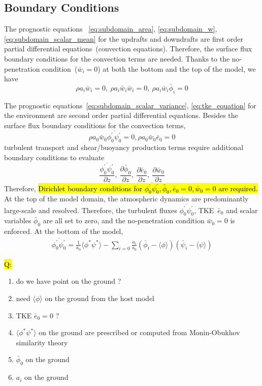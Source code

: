 \documentclass{report}
\begin{document}
\subsection{Boundary Conditions} 
\label{sec:Boundary Conditions}
The prognostic equations ~\ref{eq:subdomain_area}, \ref{eq:subdomain_w}, \ref{eq:subdomain_scalar_mean} for the updrafts and downdrafts are first order partial differential equations~(convection equations). 
Therefore, the surface flux boundary conditions for the convection terms are needed.
Thanks to the no-penetration condition~($ \bar{w}_i = 0$) at both the bottom and the top of the model, we have 
$$\rho a_i \bar{w}_i = 0,\ \rho a_i \bar{w}_i\bar{w}_i = 0,\ \rho a_i \bar{w}_i\bar{\phi}_i = 0 $$


The prognostic equations~\ref{eq:subdomain_scalar_variance}, \ref{eq:tke_equation} for the environment are second order partial differential equations. Besides the surface flux boundary conditions for the convection terms, 
$$\rho a_0 \bar{w}_0 \overline{\phi_0^{'}\psi_0^{'}} = 0, \rho a_0 \bar{w}_0 \bar{e}_0 = 0$$
turbulent transport and shear/buoyancy production terms require additional boundary conditions to evaluate
$$\frac{\overline{\phi_0^{'}\psi_0^{'}}}{\partial z}, \ 
\frac{\partial \bar{\phi}_0}{\partial z},\ 
\frac{\partial \bar{e}_0}{\partial z}, \ 
\frac{\partial \bar{w}_0}{\partial z}$$
Therefore, \hl{Dirichlet boundary conditions for $\overline{\phi_0^{'}\psi_0^{'}}, \bar{\phi}_0, \bar{e}_0 =0, \bar{w}_0 = 0$ are required.}
At the top of the model domain, the atmospheric dynamics are predominantly large-scale and resolved. Therefore, the turbulent fluxes $\overline{\phi_0^{'}\psi_0^{'}}$, TKE~$\bar{e}_0$ and scalar variables $\bar{\phi}_0$ are all set to zero, and the no-penetration condition $\bar{w}_0 = 0$ is enforced.
At the bottom of the model, 
\begin{align*}
    \overline{\phi_0^{'}\psi_0^{'}} = \frac{1}{a_0}\langle\phi^{*}\psi^{*}\rangle - \sum_{i=0} \frac{a_i}{a_0}(\bar{\phi}_i - \langle\phi\rangle)(\bar{\psi}_i - \langle\psi\rangle)
\end{align*}


\hl{Q: }
\begin{enumerate}
    \item do we have point on the ground ?
    \item need $\langle\phi\rangle$ on the ground from the host model
    \item TKE $\bar{e}_0 = 0$ ?
    \item $\langle\phi^{*}\psi^{*}\rangle$ on the ground are prescribed or computed from Monin-Obukhov similarity theory
    \item $\bar{\phi}_0$ on the ground
    \item $a_i$ on the ground
\end{enumerate}
\end{document}

